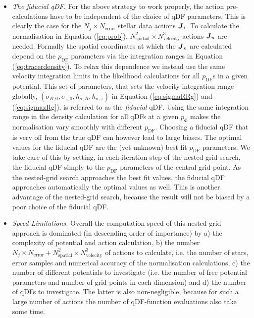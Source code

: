\begin{itemize}
\item \emph{The fiducial qDF.} For the above strategy to work properly, the action pre-calculations have to be independent of the choice of qDF parameters. This is clearly the case for the $N_j \times N_\text{error}$ stellar data actions $\boldsymbol{J}_i$. To calculate the normalisation in Equation (\ref{eq:prob}), $N_\text{spatial}^2 \times N_\text{velocity}^3$ actions $\boldsymbol{J}_n$ are needed. Formally the spatial coordinates at which the $\boldsymbol{J}_n$ are calculated depend on the $p_\text{DF}$ parameters via the integration ranges in Equation (\ref{eq:tracerdensity}). To relax this dependence we instead use the same velocity integration limits in the likelihood calculations for all $p_\text{DF}$s in a given potential. This set of parameters, that sets the velocity integration range globally, $(\sigma_{R,0},\sigma_{z,0},h_{\sigma,R},h_{\sigma,z})$ in Equation (\ref{eq:sigmaRRg}) and (\ref{eq:sigmazRg}), is referred to as the \emph{fiducial} qDF. Using the same integration range in the density calculation for all qDFs at a given $p_\Phi$ makes the normalisation vary smoothly with different $p_\text{DF}$. Choosing a fiducial qDF that is very off from the true qDF can however lead to large biases. The optimal values for the fiducial qDF are the (yet unknown) best fit $p_\text{DF}$ parameters. We take care of this by setting, in each iteration step of the nested-grid search, the fiducial qDF simply to the $p_\text{DF}$ parameters of the central grid point.  As the nested-grid search approaches the best fit values, the fiducial qDF approaches automatically the optimal values as well. This is another advantage of the nested-grid search, because the result will not be biased by a poor choice of the fiducial qDF.

\item \emph{Speed Limitations.} Overall the computation speed of this nested-grid approach is dominated (in descending order of importance) by a) the complexity of potential and action calculation, b) the number $N_j \times N_\text{error} + N_\text{spatial}^2 \times N_\text{velocity}^3$ of actions to calculate, i.e. the number of stars, error samples and numerical accuracy of the normalisation calculations, c) the number of different potentials to investigate (i.e. the number of free potential parameters and number of grid points in each dimension) and d) the number of qDFs to investigate. The latter is also non-negligible, because for such a large number of actions the number of  qDF-function evaluations also take some time.
\end{itemize}

